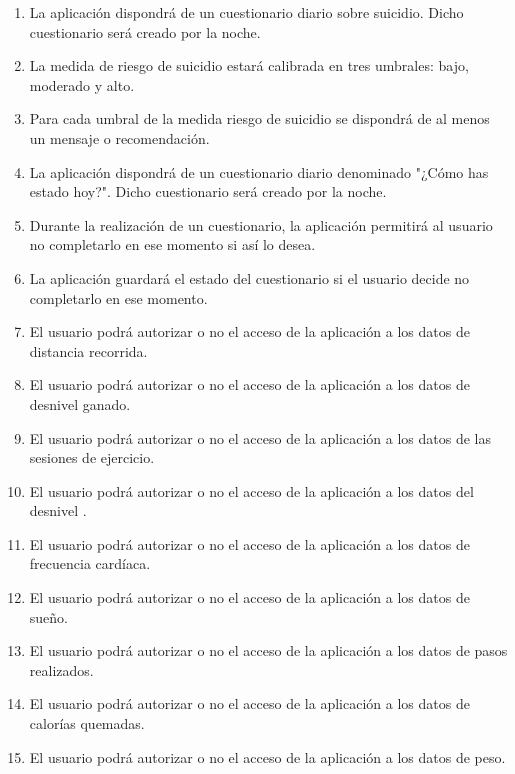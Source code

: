 \begin{enumerate}[label=\textbf{\texttt{RF-\arabic*}}]
            \item La aplicación dispondrá de un cuestionario diario sobre suicidio. Dicho cuestionario será creado por la noche.
            \item La medida de riesgo de suicidio estará calibrada en tres umbrales: bajo, moderado y alto.
            \item Para cada umbral de la medida riesgo de suicidio se dispondrá de al menos un mensaje o recomendación.
            \item La aplicación dispondrá de un cuestionario diario denominado "¿Cómo has estado hoy?". Dicho cuestionario será creado por la noche.

            \item Durante la realización de un cuestionario, la aplicación permitirá al usuario no completarlo en ese momento si así lo desea.
            \item La aplicación guardará el estado del cuestionario si el usuario decide no completarlo en ese momento.

            \item El usuario podrá autorizar o no el acceso de la aplicación a los datos de distancia recorrida.
            \item El usuario podrá autorizar o no el acceso de la aplicación a los datos de desnivel ganado.
            \item El usuario podrá autorizar o no el acceso de la aplicación a los datos de las sesiones de ejercicio.
            \item El usuario podrá autorizar o no el acceso de la aplicación a los datos del desnivel .
            \item El usuario podrá autorizar o no el acceso de la aplicación a los datos de frecuencia cardíaca.
            \item El usuario podrá autorizar o no el acceso de la aplicación a los datos de sueño.
            \item El usuario podrá autorizar o no el acceso de la aplicación a los datos de pasos realizados.
            \item El usuario podrá autorizar o no el acceso de la aplicación a los datos de calorías quemadas.
            \item El usuario podrá autorizar o no el acceso de la aplicación a los datos de peso.


\end{enumerate}
